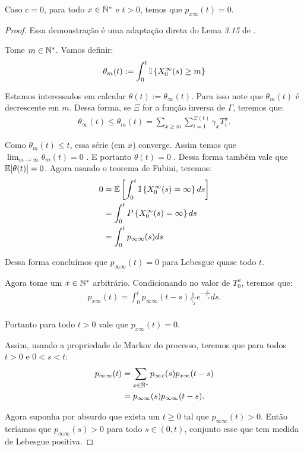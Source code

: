 \begin{proposicao}
  \label{prop:naocontinuidade}
  Caso $c = 0$, para todo $x \in {\mathbb{\bar{N}^*}}$ e $t > 0$, temos que $p_{x
    \infty} (t) = 0$.
\end{proposicao}
\begin{proof}
  Essa demonstração é uma adaptação direta do Lema \emph{3.15} de
  \cite{fontes:08}.

  Tome $m \in {\mathbb{N^*}}$. Vamos definir:
  \begin{align*}
    \theta_m(t) := \int_0^t {\mathbb{I}} \left\{ X^\infty_0(s) \geq m \right\}
  \end{align*}

  Estamos interessados em calcular $\theta(t) :=
  \theta_\infty(t)$. Para isso note que $\theta_m(t)$ é decrescente em
  $m$. Dessa forma, se $\Xi$ for a função inversa de $\Gamma$, teremos
  que:
  \begin{align*}
    \theta_\infty(t) \leq \theta_m(t) = \sum_{x \geq m}
    \sum_{i=1}^{\Xi(t)} \gamma_x T^x_i.
  \end{align*}


  Como $\theta_m(t) \leq t$, essa série (em $x$) converge. Assim temos
  que $\lim_{m\to\infty} \theta_m(t) = 0$ \qc. E portanto $\theta(t) =
  0$ \qc. Dessa forma também vale que ${\mathbb{E}}[\theta(t)] = 0$. Agora
  usando o teorema de Fubini, teremos:
  \begin{align*}
    0 &= {\mathbb{E}}\left[ \int_0^t {\mathbb{I}} \left\{ X^\infty_0(s) = \infty
      \right\} ds \right]\\
    &= \int_0^t P \left\{ X^\infty_0(s) = \infty
    \right\} ds\\
    &= \int_0^t p_{\infty \infty} (s) ds
  \end{align*}

  Dessa forma concluímos que $p_{\infty \infty} (t) = 0$ para Lebesgue
  quase todo $t$.

  Agora tome um $x \in {\mathbb{N^*}}$ arbitrário. Condicionando no valor de
  $T^x_0$, teremos que:
  \begin{align*}
    p_{x \infty} (t) = \int_0^t p_{\infty \infty} (t-s)
    \frac{1}{\gamma_x}e^{-\frac{s}{\gamma_x}} ds.\\
  \end{align*}

  Portanto para todo $t > 0$ vale que $p_{x \infty} (t) = 0$.

  Assim, usando a propriedade de Markov do processo, teremos que para
  todos $t> 0$ e $0 < s < t$:
  \begin{align*}
    p_{\infty \infty} (t) &= \sum_{x \in {\mathbb{\bar{N}^*}}} p_{\infty x}(s) p_{x
      \infty} (t-s)\\
    &= p_{\infty \infty} (s) p_{\infty \infty} (t-s).
  \end{align*}

  Agora suponha por absurdo que exista um $t \geq 0$ tal que
  $p_{\infty \infty} (t) > 0$. Então teríamos que $p_{\infty
    \infty}(s) > 0$ para todo $s \in (0, t)$, conjunto esse que tem
  medida de Lebesgue positiva.
\end{proof}


